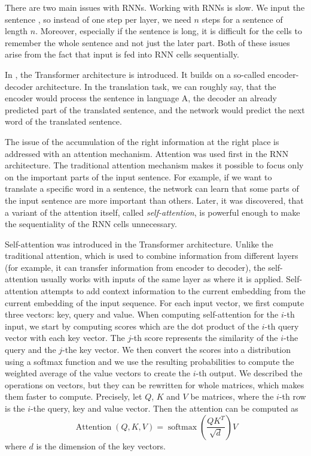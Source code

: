 There are two main issues with RNNs. Working with RNNs is slow. We input the sentence , so instead of one step per layer, we need $n$ steps for a sentence of length $n$. Moreover, especially if the sentence is long, it is difficult for the cells to remember the whole sentence and not just the later part. Both of these issues arise from the fact that input is fed into RNN cells sequentially. 

In \cite{vaswani2017attention}, the Transformer architecture is introduced. It builds on a so-called encoder-decoder architecture. In the translation task, we can roughly say, that the encoder would process the sentence in language A, the decoder an already predicted part of the translated sentence, and the network would predict the next word of the translated sentence.


The issue of the accumulation of the right information at the right place is addressed with an attention mechanism. Attention was used first in the RNN architecture. The traditional attention mechanism makes it possible to focus only on the important parts of the input sentence. For example, if we want to translate a specific word in a sentence, the network can learn that some parts of the input sentence are more important than others. Later, it was discovered, that a variant of the attention itself, called \textit{self-attention}, is powerful enough to make the sequentiality of the RNN cells unnecessary.

Self-attention was introduced in the Transformer architecture. Unlike the traditional attention, which is used to combine information from different layers (for example, it can transfer information from encoder to decoder), the self-attention usually works with inputs of the same layer as where it is applied. Self-attention attempts to add context information to the current embedding from the current embedding of the input sequence. For each input vector, we first compute three vectors: key, query and value. When computing self-attention for the $i$-th input, we start by computing scores which are the dot product of the $i$-th query vector with each key vector. The $j$-th score represents the similarity of the $i$-the query and the $j$-the key vector. We then convert the scores into a distribution using a softmax function and we use the resulting probabilities to compute the weighted average of the value vectors to create the $i$-th output. We described the operations on vectors, but they can be rewritten for whole matrices, which makes them faster to compute. Precisely, let $Q$, $K$ and $V$ be matrices, where the $i$-th row is the $i$-the query, key and value vector. Then the attention can be computed as 
\[\operatorname{Attention}\left( Q,K,V\right) = \operatorname{softmax}\left(\frac{QK^{T}}{\sqrt{d}}\right) V \]
where $d$ is the dimension of the key vectors.


